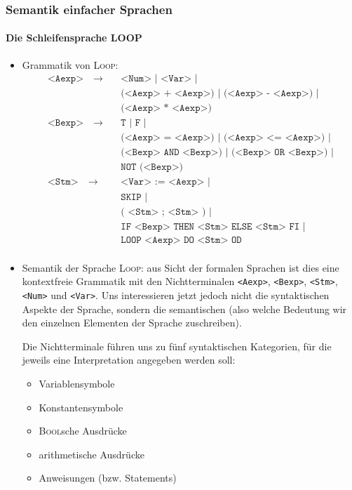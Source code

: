 \documentclass[
  a4paper,
  11pt,
]{scrartcl}
\begin{document}
\subsubsection{Semantik einfacher Sprachen}
\label{ssub:semantik_einfacher_sprachen}

\paragraph{Die Schleifensprache LOOP}
\label{par:die_schleifensprache_loop}

\begin{itemize}
  \item Grammatik von \textsc{Loop}:
    \begin{align*}
      \texttt{<Aexp>} \quad \rightarrow \quad
        & \texttt{<Num> | <Var> |}\\
        & \texttt{(<Aexp> + <Aexp>) | (<Aexp> - <Aexp>) |}\\
        & \texttt{(<Aexp> * <Aexp>)}\\
      \texttt{<Bexp>} \quad \rightarrow \quad
        & \texttt{T | F |}\\
        & \texttt{(<Aexp> = <Aexp>) | (<Aexp> <= <Aexp>) |}\\
        & \texttt{(<Bexp> AND <Bexp>) | (<Bexp> OR <Bexp>) |}\\
        & \texttt{NOT (<Bexp>)}\\
      \texttt{<Stm>} \quad \rightarrow \quad
        & \texttt{<Var> := <Aexp> |}\\
        & \texttt{SKIP |}\\
        & \texttt{( <Stm> ; <Stm> ) |}\\
        & \texttt{IF <Bexp> THEN <Stm> ELSE <Stm> FI |}\\
        & \texttt{LOOP <Aexp> DO <Stm> OD}\\
    \end{align*}

  \item Semantik der Sprache \textsc{Loop}:
    aus Sicht der formalen Sprachen ist dies eine kontextfreie Grammatik mit den
    Nichtterminalen \texttt{<Aexp>}, \texttt{<Bexp>}, \texttt{<Stm>},
    \texttt{<Num>} und \texttt{<Var>}. Uns interessieren jetzt jedoch nicht die
    syntaktischen Aspekte der Sprache, sondern die semantischen (also welche
    Bedeutung wir den einzelnen Elementen der Sprache zuschreiben).

    Die Nichtterminale führen uns zu fünf syntaktischen Kategorien, für die
    jeweils eine Interpretation angegeben werden soll:
    \begin{itemize}
      \item Variablensymbole
      \item Konstantensymbole
      \item \textsc{Bool}sche Ausdrücke
      \item arithmetische Ausdrücke
      \item Anweisungen (bzw. Statements)
    \end{itemize}


\end{itemize}
\end{document}
